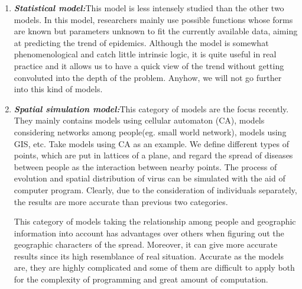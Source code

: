 \begin{enumerate}
	\item \textbf{\emph{Statistical model:}}This model is less intensely studied than the other two models. In this model, researchers mainly use possible functions whose forms are known but parameters unknown to fit the currently available data, aiming at predicting the trend of epidemics. Although the model is somewhat phenomenological and catch little intrinsic logic, it is quite useful in real practice and it allows us to have a quick view of the trend without getting convoluted into the depth of the problem. Anyhow, we will not go further into this kind of models.
	\item \textbf{\emph{Spatial simulation model:}}This category of models are the focus recently. They mainly contains models using cellular automaton (CA), models considering networks among people(eg. small world network), models using GIS\cite{GIS}, etc. Take models using CA as an example. We define different types of points, which are put in lattices of a plane, and regard the spread of diseases between people as the interaction between nearby points. The process of evolution and spatial distribution of virus can be simulated with the aid of computer program. Clearly, due to the consideration of individuals separately, the results are more accurate than previous two categories.

	      This category of models taking the relationship among people and geographic information into account has advantages over others when figuring out the geographic characters of the spread. Moreover, it can give more accurate results since its high resemblance of real situation. Accurate as the models are, they are highly complicated and some of them are difficult to apply both for the complexity of programming and great amount of computation.
\end{enumerate}